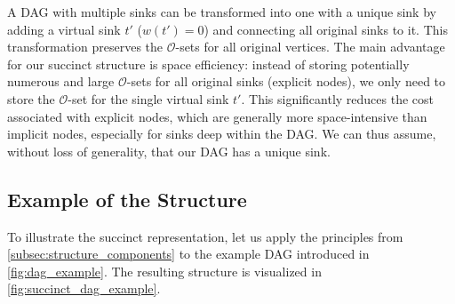 \begin{remark}
    A DAG with multiple sinks can be transformed into one with a unique sink by adding a virtual sink $t'$ ($w(t')=0$) and connecting all original sinks to it. This transformation preserves the $\mathcal{O}$-sets for all original vertices. The main advantage for our succinct structure is space efficiency: instead of storing potentially numerous and large $\mathcal{O}$-sets for all original sinks (explicit nodes), we only need to store the $\mathcal{O}$-set for the single virtual sink $t'$. This significantly reduces the cost associated with explicit nodes, which are generally more space-intensive than implicit nodes, especially for sinks deep within the DAG. We can thus assume, without loss of generality, that our DAG has a unique sink.
\end{remark}


\subsection*{Example of the Structure}
\label{subsec:structure_example}

To illustrate the succinct representation, let us apply the principles from \autoref{subsec:structure_components} to the example DAG introduced in \autoref{fig:dag_example}. The resulting structure is visualized in \autoref{fig:succinct_dag_example}.

